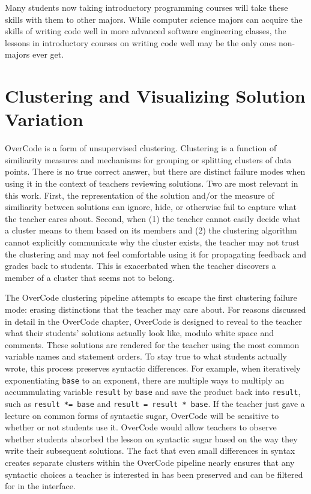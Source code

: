 Many students now taking introductory programming courses will take these skills with them to other majors. While computer science majors can acquire the skills of writing code well in more advanced software engineering classes, the lessons in introductory courses on writing code well may be the only ones non-majors ever get.


\section{Clustering and Visualizing Solution Variation}

OverCode is a form of unsupervised clustering. Clustering is a function of similiarity measures and mechanisms for grouping or splitting clusters of data points. There is no true correct answer, but there are distinct failure modes when using it in the context of teachers reviewing solutions. Two are most relevant in this work. First, the representation of the solution and/or the measure of similiarity between solutions can ignore, hide, or otherwise fail to capture what the teacher cares about. Second, when (1) the teacher cannot easily decide what a cluster means to them based on its members and (2) the clustering algorithm cannot explicitly communicate why the cluster exists, the teacher may not trust the clustering and may not feel comfortable using it for propagating feedback and grades back to students. This is exacerbated when the teacher discovers a member of a cluster that seems not to belong.

The OverCode clustering pipeline attempts to escape the first clustering failure mode: erasing distinctions that the teacher may care about. For reasons discussed in detail in the OverCode chapter, OverCode is designed to reveal to the teacher what their students' solutions actually look like, modulo white space and comments. These solutions are rendered for the teacher using the most common variable names and statement orders. To stay true to what students actually wrote, this process preserves syntactic differences. For example, when iteratively exponentiating \texttt{base} to an exponent, there are multiple ways to multiply an accummulating variable \texttt{result} by \texttt{base} and save the product back into \texttt{result}, such as \texttt{result *= base} and \texttt{result = result * base}. If the teacher just gave a lecture on common forms of syntactic sugar, OverCode will be sensitive to whether or not students use it. OverCode would allow teachers to observe whether students absorbed the lesson on syntactic sugar based on the way they write their subsequent solutions. The fact that even small differences in syntax creates separate clusters within the OverCode pipeline nearly ensures that any syntactic choices a teacher is interested in has been preserved and can be filtered for in the interface.

